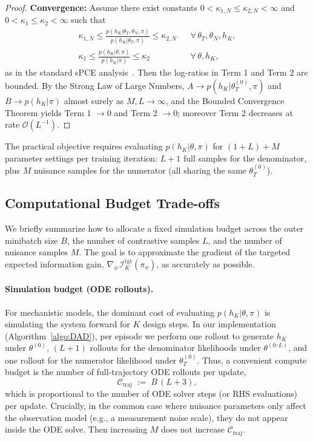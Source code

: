 \begin{proof}
\textbf{Convergence:} Assume there exist constants $0<\kappa_{1,N} \le \kappa_{2,N}<\infty$ and $0<\kappa_1 \le \kappa_2<\infty$ such that
\begin{align}
\kappa_{1,N} \le \frac{p(h_K|\theta_T,\theta_N,\pi)}{p(h_K|\theta_T,\pi)} \le \kappa_{2,N} && \forall\,\theta_T,\theta_N,h_K, \\
\kappa_1 \le \frac{p(h_K|\theta,\pi)}{p(h_K|\pi)} \le \kappa_2 && \forall\,\theta,h_K,
\end{align}
as in the standard sPCE analysis~\cite{foster2021}. Then the log-ratios in Term 1 and Term 2 are bounded. By the Strong Law of Large Numbers, $A \to p(h_K|\theta_T^{(0)},\pi)$ and $B \to p(h_K|\pi)$ almost surely as $M,L\to\infty$, and the Bounded Convergence Theorem yields Term 1 $\to 0$ and Term 2 $\to 0$; moreover Term 2 decreases at rate $\mathcal{O}(L^{-1})$.
\end{proof}

\begin{remark}
The practical objective requires evaluating $p(h_K|\theta, \pi)$ for $(1+L) + M$ parameter settings per training iteration: $L+1$ full samples for the denominator, plus $M$ nuisance samples for the numerator (all sharing the same $\theta_T^{(0)}$).
\end{remark}

\subsection{Computational Budget Trade-offs}
\label{sec:budget_stub}

We briefly summarize how to allocate a fixed simulation budget across the outer minibatch size $B$, the number of contrastive samples $L$, and the number of nuisance samples $M$.
The goal is to approximate the gradient of the targeted expected information gain, $\nabla_\phi\,\mathcal{I}_K^{\text{tgt}}(\pi_\phi)$, as accurately as possible.

\paragraph{Simulation budget (ODE rollouts).}
For mechanistic models, the dominant cost of evaluating $p(h_K|\theta,\pi)$ is simulating the system forward for $K$ design steps.
In our implementation (Algorithm~\ref{algo:DAD}), per episode we perform
one rollout to generate $h_K$ under $\theta^{(0)}$, $(L+1)$ rollouts for the denominator likelihoods under $\theta^{(0:L)}$, and one rollout for the numerator likelihood under $\theta_T^{(0)}$.
Thus, a convenient compute budget is the number of full-trajectory ODE rollouts per update,
\begin{equation}
\label{eq:budget_rollouts}
\mathcal{C}_{\text{traj}} \;:=\; B\,(L+3),
\end{equation}
which is proportional to the number of ODE solver steps (or RHS evaluations) per update.
Crucially, in the common case where nuisance parameters only affect the observation model (e.g., a measurement noise scale), they do not appear inside the ODE solve.
Then increasing $M$ does not increase $\mathcal{C}_{\text{traj}}$.

